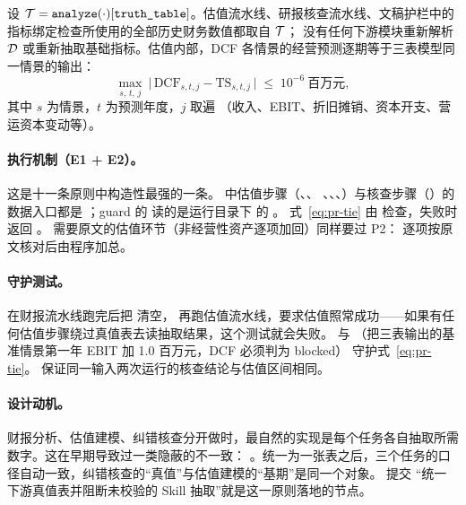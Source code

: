 \begin{invariant}[单一数据源]\label{inv:pr-truth}
设 $\mathcal{T}=\texttt{analyze}(\cdot)[\texttt{truth\_table}]$。估值流水线、研报核查流水线、文稿护栏中的指标绑定检查所使用的全部历史财务数值都取自 $\mathcal{T}$；
没有任何下游模块重新解析 $\mathcal{D}$ 或重新抽取基础指标。估值内部，DCF 各情景的经营预测逐期等于三表模型同一情景的输出：
\begin{equation}
  \max_{s,\,t,\,j}\ \bigl|\,\text{DCF}_{s,t,j} - \text{TS}_{s,t,j}\,\bigr| \;\le\; 10^{-6}\ \text{百万元},
  \label{eq:pr-tie}
\end{equation}
其中 $s$ 为情景，$t$ 为预测年度，$j$ 取遍 （收入、EBIT、折旧摊销、资本开支、营运资本变动等）。
\end{invariant}

\paragraph{执行机制（E1 + E2）。}这是十一条原则中构造性最强的一条。 中估值步骤（、、
、、、）与核查步骤（）的数据入口都是
；guard 的  读的是运行目录下  的 。
式~\eqref{eq:pr-tie} 由  检查，失败时  返回 。
需要原文的估值环节（非经营性资产逐项加回）同样要过 P2： 逐项按原文核对后由程序加总。

\paragraph{守护测试。} 在财报流水线跑完后把  清空，
再跑估值流水线，要求估值照常成功——如果有任何估值步骤绕过真值表去读抽取结果，这个测试就会失败。
 与 （把三表输出的基准情景第一年 EBIT 加 1.0 百万元，DCF 必须判为 blocked）
守护式~\eqref{eq:pr-tie}。 保证同一输入两次运行的核查结论与估值区间相同。

\paragraph{设计动机。}财报分析、估值建模、纠错核查分开做时，最自然的实现是每个任务各自抽取所需数字。这在早期导致过一类隐蔽的不一致：
。统一为一张表之后，三个任务的口径自动一致，纠错核查的“真值”与估值建模的“基期”是同一个对象。
提交 “统一下游真值表并阻断未校验的 Skill 抽取”就是这一原则落地的节点。

